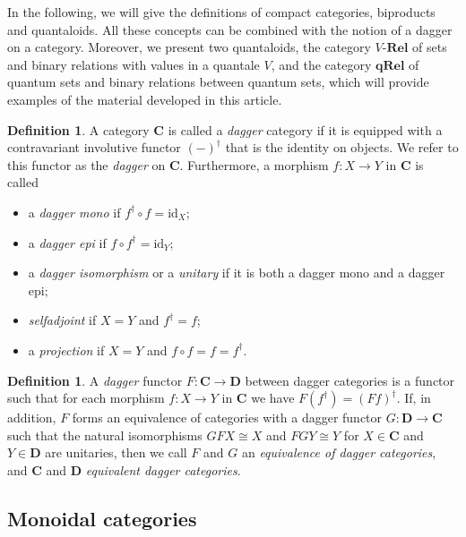 \documentclass[12pt]{tac}
\theoremstyle{definition}
\newtheorem{definition}[theorem]{Definition}
\theoremstyle{remark}
\newcommand{\<}{\langle}
\renewcommand{\>}{\rangle}
\renewcommand{\:}{\colon}
\newcommand{\id}{\mathrm{id}}
\begin{document}
In the following, we will give the definitions of compact categories, biproducts and quantaloids. All these concepts can be combined with the notion of a dagger on a category. Moreover, we present two quantaloids, the category $V$-$\mathbf{Rel}$ of sets and binary relations with values in a quantale $V$, and the category $\mathbf{qRel}$ of quantum sets and binary relations between quantum sets, which will provide examples of the material developed in this article.

\begin{definition}
    A category $\mathbf C$ is called a \emph{dagger} category if it is equipped with a contravariant involutive functor $(-)^\dag$ that is the identity on objects. We refer to this functor as the \emph{dagger} on $\mathbf C$. Furthermore, a morphism $f:X\to Y$ in $\mathbf C$ is called
    \begin{itemize}
    \item a \emph{dagger mono} if $f^\dag\circ f=\id_X$;
    \item a \emph{dagger epi} if $f\circ f^\dag=\id_Y$;
    \item a \emph{dagger isomorphism} or a \emph{unitary} if it is both a dagger mono and a dagger epi;
        \item \emph{selfadjoint} if $X=Y$ and $f^\dag=f$;
    \item a \emph{projection} if $X=Y$ and $f\circ f=f=f^\dag$.    \end{itemize}
    \end{definition}

\begin{definition}
 A \emph{dagger} functor $ F:\mathbf C\to\mathbf D$ between dagger categories is a functor such that for each morphism $f:X\to Y$ in $\mathbf C$ we have $F(f^\dag)=(Ff)^\dag$. If, in addition, $F$ forms an equivalence of categories with a  dagger functor $G:\mathbf D\to\mathbf C$ such that the natural isomorphisms $GFX\cong X$ and $FGY\cong Y$ for $X\in\mathbf C$ and $Y\in\mathbf D$ are unitaries, then we call $F$ and $G$ an \emph{equivalence of dagger categories}, and $\mathbf C$ and $\mathbf D$ \emph{equivalent dagger categories}.
\end{definition}

\subsection{Monoidal categories}
\end{document}
